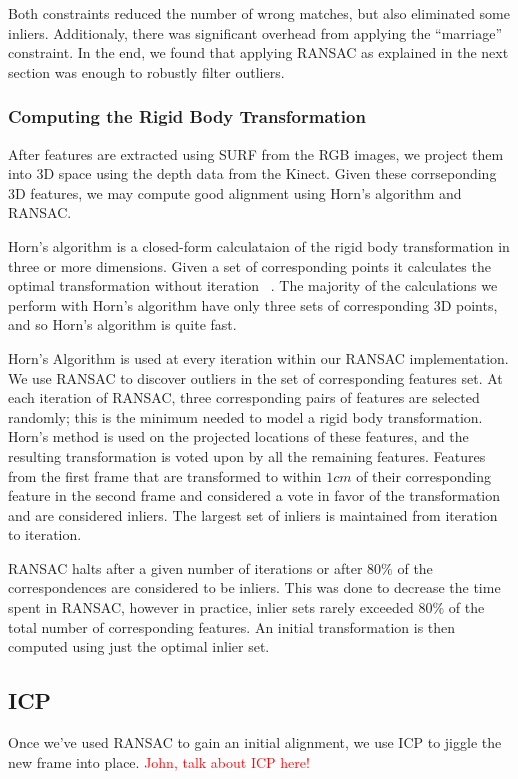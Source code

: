 \documentclass[letterpaper, 10pt, conference]{ieeeconf}
\newcommand{\xxx}[1]{\textcolor{red}{#1}}
\begin{document}
Both constraints reduced the number of wrong matches, but also eliminated some inliers.
Additionaly, there was significant overhead from applying the ``marriage'' constraint.
In the end, we found that applying RANSAC as explained in the next section was enough
to robustly filter outliers.

\subsubsection{Computing the Rigid Body Transformation}
\label{ransac}
After features are extracted using SURF from the RGB images, we project
them into 3D space using the depth data from the Kinect. Given these
corrseponding 3D features, we may compute good alignment using Horn's
algorithm and RANSAC.

Horn's algorithm is a closed-form calculataion of the rigid body
transformation in three or more dimensions.  Given a set of corresponding
points it calculates the optimal transformation without iteration
~\cite{horn1987closed}.  The majority of the calculations we perform with
Horn's algorithm have only three sets of corresponding 3D points, and so
Horn's algorithm is quite fast.

Horn's Algorithm is used at every iteration within our RANSAC implementation.
We use RANSAC to discover outliers in the set of corresponding features
set.  At each iteration of RANSAC, three corresponding pairs of features
are selected randomly; this is the minimum needed to model a rigid body
transformation.  Horn's method is used on the projected locations of these
features, and the resulting transformation is voted upon by all the remaining
features.  Features from the first frame that are transformed to within $1cm$
of their corresponding feature in the second frame and considered a vote in
favor of the transformation and are considered inliers.  The largest set of
inliers is maintained from iteration to iteration.

RANSAC halts after a given number of iterations or after $80\%$ of the
correspondences are considered to be inliers.  This was done to decrease
the time spent in RANSAC, however in practice, inlier sets rarely exceeded
$80\%$ of the total number of corresponding features.  An initial
transformation is then computed using just the optimal inlier set.

\subsection{ICP}
Once we've used RANSAC to gain an initial alignment, we use ICP to jiggle the
new frame into place. \xxx{John, talk about ICP here!}
\end{document}
